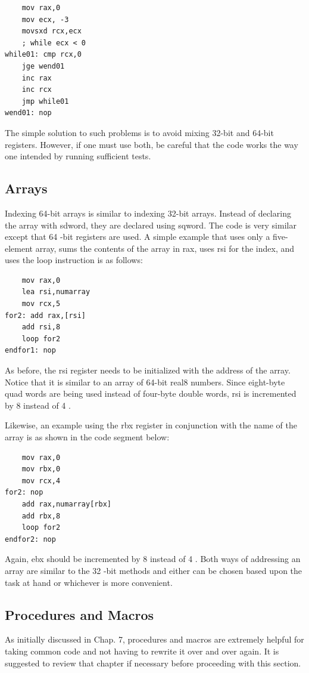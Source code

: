 \documentclass[10pt]{article}
\begin{document}
\begin{verbatim}
    mov rax,0
    mov ecx, -3
    movsxd rcx,ecx
    ; while ecx < 0
while01: cmp rcx,0
    jge wend01
    inc rax
    inc rcx
    jmp while01
wend01: nop
\end{verbatim}

The simple solution to such problems is to avoid mixing 32-bit and 64-bit registers. However, if one must use both, be careful that the code works the way one intended by running sufficient tests.

\subsection*{Arrays}
Indexing 64-bit arrays is similar to indexing 32-bit arrays. Instead of declaring the array with sdword, they are declared using sqword. The code is very similar except that 64 -bit registers are used. A simple example that uses only a five-element array, sums the contents of the array in rax, uses rsi for the index, and uses the loop instruction is as follows:

\begin{verbatim}
    mov rax,0
    lea rsi,numarray
    mov rcx,5
for2: add rax,[rsi]
    add rsi,8
    loop for2
endfor1: nop
\end{verbatim}

As before, the rsi register needs to be initialized with the address of the array. Notice that it is similar to an array of 64-bit real8 numbers. Since eight-byte quad words are being used instead of four-byte double words, rsi is incremented by 8 instead of 4 .

Likewise, an example using the rbx register in conjunction with the name of the array is as shown in the code segment below:

\begin{verbatim}
    mov rax,0
    mov rbx,0
    mov rcx,4
for2: nop
    add rax,numarray[rbx]
    add rbx,8
    loop for2
endfor2: nop
\end{verbatim}

Again, ebx should be incremented by 8 instead of 4 . Both ways of addressing an array are similar to the 32 -bit methods and either can be chosen based upon the task at hand or whichever is more convenient.

\subsection*{Procedures and Macros}
As initially discussed in Chap. 7, procedures and macros are extremely helpful for taking common code and not having to rewrite it over and over again. It is suggested to review that chapter if necessary before proceeding with this section.
\end{document}
